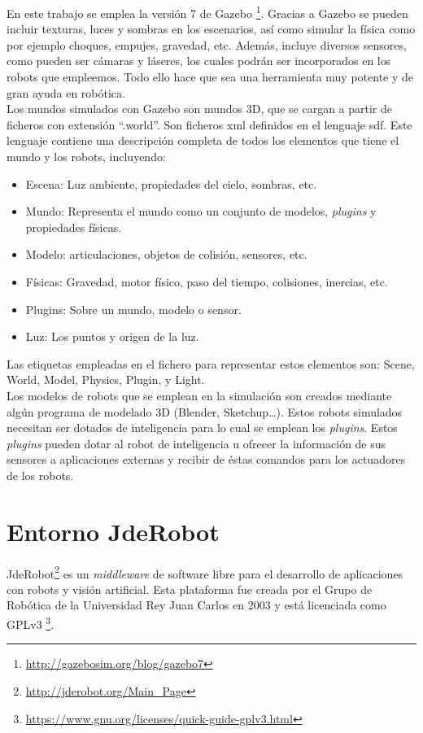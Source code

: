 En este trabajo se emplea la versión 7 de Gazebo \footnote{\url{http://gazebosim.org/blog/gazebo7}}.  Gracias a Gazebo se pueden incluir texturas, luces y sombras en los escenarios, así como simular la física como por ejemplo choques, empujes, gravedad, etc. Además, incluye diversos sensores, como pueden ser cámaras y láseres, los cuales podrán ser incorporados en los robots que empleemos. Todo ello hace que sea una herramienta muy potente y de gran ayuda en robótica.\\

Los mundos simulados con Gazebo son mundos 3D, que se cargan a partir de ficheros con extensión ``.world''. Son ficheros \acrfull{xml} definidos en el lenguaje \acrfull{sdf}. Este lenguaje contiene una descripción completa de todos los elementos que tiene el mundo y los robots, incluyendo:

\begin{itemize}
\item Escena: Luz ambiente, propiedades del cielo, sombras, etc.
\item Mundo: Representa el mundo como un conjunto de modelos, \textit{plugins} y propiedades físicas.
\item Modelo: articulaciones, objetos de colisión, sensores, etc.
\item Físicas: Gravedad, motor físico, paso del tiempo, colisiones, inercias, etc.
\item Plugins: Sobre un mundo, modelo o sensor.
\item Luz: Los puntos y origen de la luz.
\end{itemize}

Las etiquetas empleadas en el fichero para representar estos elementos son: Scene, World, Model, Physics, Plugin, y Light.\\

Los modelos de robots que se emplean en la simulación son creados mediante algún programa de modelado 3D (Blender, Sketchup…). Estos robots simulados necesitan ser dotados de inteligencia para lo cual se emplean los \textit{plugins}. Estos \textit{plugins} pueden dotar al robot de inteligencia u ofrecer la información de sus sensores a aplicaciones externas y recibir de éstas comandos para los actuadores de los robots.


\section{Entorno JdeRobot}
JdeRobot\footnote{\url{http://jderobot.org/Main_Page}} es un \textit{middleware} de software libre para el desarrollo de aplicaciones con robots y visión artificial. Esta plataforma fue creada por el Grupo de Robótica de la Universidad Rey Juan Carlos en 2003 y está licenciada como GPLv3 \footnote{\url{https://www.gnu.org/licenses/quick-guide-gplv3.html}}.\\

